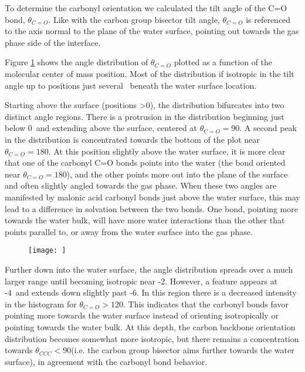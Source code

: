 To determine the carbonyl orientation we calculated the tilt angle of the C=O bond, $\theta_{C=O}$. Like with the carbon group bisector tilt angle, $\theta_{C=O}$ is referenced to the axis normal to the plane of the water surface, pointing out towards the gas phase side of the interface.

Figure \ref{fig:carbonyl-tilt} shows the angle distribution of $\theta_{C=O}$ plotted as a function of the molecular center of mass position. Most of the distribution if isotropic in the tilt angle up to positions just several \angs~beneath the water surface location.

Starting above the surface (positions >0\angs), the distribution bifurcates into two distinct angle regions. There is a protrusion in the distribution beginning just below 0\angs~and extending above the surface, centered at $\theta_{C=O}=90$\textdegree. A second peak in the distribution is concentrated towards the bottom of the plot near $\theta_{C=O}=180$\textdegree. At this position slightly above the water surface, it is more clear that one of the carbonyl C=O bonds points into the water (the bond oriented near $\theta_{C=O}=180$\textdegree), and the other points more out into the plane of the surface and often slightly angled towards the gas phase.  When these two angles are manifested by malonic acid carbonyl bonds just above the water surface, this may lead to a difference in solvation between the two bonds. One bond, pointing more towards the water bulk, will have more water interactions than the other that points parallel to, or away from the water surface into the gas phase.


\begin{figure}[h!]
	\begin{center}
		\texttt{[image: ]}
		\caption{}
		\label{fig:carbonyl-tilt}
	\end{center}
\end{figure}

Further down into the water surface, the angle distribution spreads over a much larger range until becoming isotropic near -2\angs. However, a feature appears at -4\angs~and extends down slightly past -6\angs. In this region there is a decreased intensity in the histogram for $\theta_{C=O} > 120$\textdegree. This indicates that the carbonyl bonds favor pointing more towards the water surface instead of orienting isotropically or pointing towards the water bulk. At this depth, the carbon backbone orientation distribution becomes somewhat more isotropic, but there remains a concentration towards $\theta_{CCC} < 90$\textdegree (i.e. the carbon group bisector aims further towards the water surface), in agreement with the carbonyl bond behavior.


